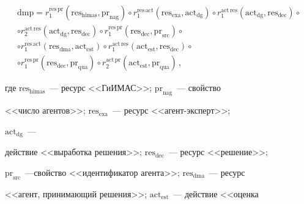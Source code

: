   \begin{multline*}


  \mathrm{dmp}=r_1^{\mathrm{res}\,\mathrm{pr}}\left( \mathrm{res}_{\mathrm{himas}},


  \mathrm{pr}_{\mathrm{nag}}\right)\circ r_1^{\mathrm{res}\,\mathrm{act}} \left( 


\mathrm{res}_{\mathrm{exa}}, \mathrm{act}_{\mathrm{dg}}\right)\circ r_1^{\mathrm{act}\,\mathrm{res}}\left( \mathrm{act}_{\mathrm{dg}},\mathrm{res}_{\mathrm{dec}}\right)\circ\\


  \circ r_2^{\mathrm{act}\,\mathrm{res}}\left( \mathrm{act}_{\mathrm{dg}},


  \mathrm{res}_{\mathrm{dec}}\right)\circ r_1^{\mathrm{res}\,\mathrm{pr}}\left( 


\mathrm{res}_{\mathrm{dec}}, \mathrm{pr}_{\mathrm{src}}\right)\circ\\


\circ r_1^{\mathrm{res}\,\mathrm{act}}\left( \mathrm{res}_{\mathrm{dma}}, 


\mathrm{act}_{\mathrm{est}}\right)\circ 


r_1^{\mathrm{act}\,\mathrm{res}}\left( \mathrm{act}_{\mathrm{est}}, 


\mathrm{res}_{\mathrm{dec}}\right)\circ\\


  \circ r_1^{\mathrm{res}\,\mathrm{pr}}\left( \mathrm{res}_{\mathrm{dec}},


  \mathrm{pr}_{\mathrm{qua}}\right)\circ r_2^{\mathrm{act}\,\mathrm{pr}}\left( 


\mathrm{act}_{\mathrm{est}},\mathrm{pr}_{\mathrm{qua}}\right)\,,


  \end{multline*}


где $\mathrm{res}_{\mathrm{himas}}$~--- ресурс <<\mbox{ГиИМАС}>>; $\mathrm{pr}_{\mathrm{nag}}$~--- свойство 


<<число агентов>>; $\mathrm{res}_{\mathrm{exa}}$~--- ресурс <<агент-экс\-перт>>; 


$\mathrm{act}_{\mathrm{dg}}$~--- 


действие <<выработка решения>>; $\mathrm{res}_{\mathrm{dec}}$~--- ресурс <<решение>>; 


$\mathrm{pr}_{\mathrm{src}}$~---свойство <<идентификатор агента>>; $\mathrm{res}_{\mathrm{dma}}$~--- ресурс 


<<агент, принимающий решения>>; $\mathrm{act}_{\mathrm{est}}$~--- действие <<оценка 


